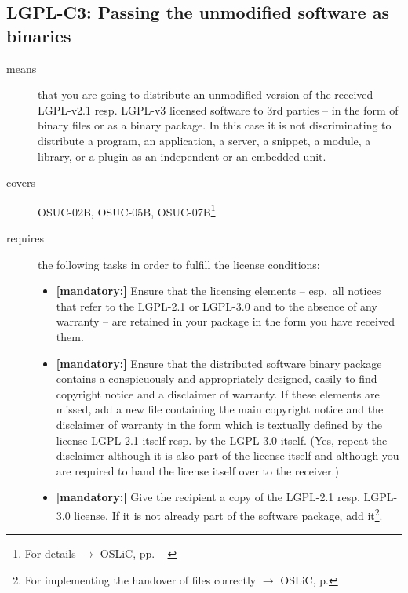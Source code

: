 \subsection{LGPL-C3: Passing the unmodified software as binaries} 
\label{OSUC-02B-LGPL} \label{OSUC-05B-LGPL} \label{OSUC-07B-LGPL} 

\begin{description}
\item[means] that you are going to distribute an unmodified version of the
received LGPL-v2.1 resp. LGPL-v3 licensed software to 3rd parties -- in the form
of binary files or as a bi\-na\-ry package. In this case it is not
discriminating to distribute a program, an application, a server, a snippet, a
module, a library, or a plugin as an independent or an embedded unit.

\item[covers] OSUC-02B, OSUC-05B, OSUC-07B\footnote{For details $\rightarrow$ OSLiC, pp.\
\pageref{OSUC-02B-DEF} - \pageref{OSUC-07B-DEF}}

\item[requires] the following tasks in order to fulfill the license conditions:
\begin{itemize}
  
  \item \textbf{[mandatory:]} Ensure that the licensing elements -- esp.\ all
  notices that refer to the LGPL-2.1 or LGPL-3.0 and to the absence of any
  warranty -- are retained in your package in the form you have received them.

  \item \textbf{[mandatory:]} Ensure that the distributed software binary
  package contains a conspicuously and appropriately designed, easily to find
  copyright notice and a disclaimer of warranty. If these elements are missed,
  add a new file containing the main copyright notice and the disclaimer of
  warranty in the form which is textually defined by the license LGPL-2.1 itself
  resp. by the LGPL-3.0 itself. (Yes, repeat the disclaimer although it is also
  part of the license itself and although you are required to hand the license
  itself over to the receiver.)
  
  \item \textbf{[mandatory:]} Give the recipient a copy of the LGPL-2.1 resp.
  LGPL-3.0 license. If it is not already part of the software package, add
  it\footnote{For implementing the handover of files correctly $\rightarrow$
  OSLiC, p. \pageref{DistributingFilesHint}}.
  

\end{itemize}
\end{description}
